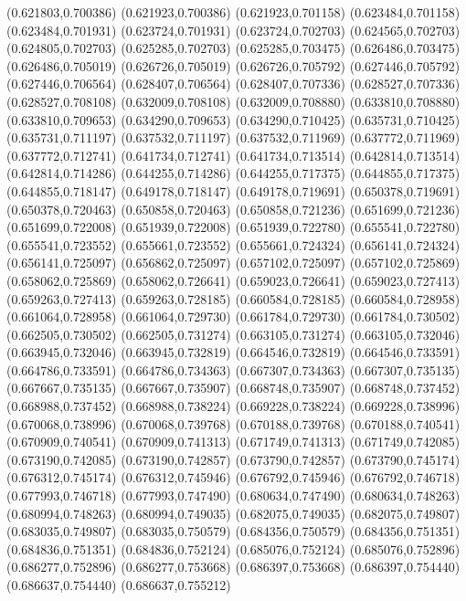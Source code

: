 (0.621803,0.700386)
(0.621923,0.700386)
(0.621923,0.701158)
(0.623484,0.701158)
(0.623484,0.701931)
(0.623724,0.701931)
(0.623724,0.702703)
(0.624565,0.702703)
(0.624805,0.702703)
(0.625285,0.702703)
(0.625285,0.703475)
(0.626486,0.703475)
(0.626486,0.705019)
(0.626726,0.705019)
(0.626726,0.705792)
(0.627446,0.705792)
(0.627446,0.706564)
(0.628407,0.706564)
(0.628407,0.707336)
(0.628527,0.707336)
(0.628527,0.708108)
(0.632009,0.708108)
(0.632009,0.708880)
(0.633810,0.708880)
(0.633810,0.709653)
(0.634290,0.709653)
(0.634290,0.710425)
(0.635731,0.710425)
(0.635731,0.711197)
(0.637532,0.711197)
(0.637532,0.711969)
(0.637772,0.711969)
(0.637772,0.712741)
(0.641734,0.712741)
(0.641734,0.713514)
(0.642814,0.713514)
(0.642814,0.714286)
(0.644255,0.714286)
(0.644255,0.717375)
(0.644855,0.717375)
(0.644855,0.718147)
(0.649178,0.718147)
(0.649178,0.719691)
(0.650378,0.719691)
(0.650378,0.720463)
(0.650858,0.720463)
(0.650858,0.721236)
(0.651699,0.721236)
(0.651699,0.722008)
(0.651939,0.722008)
(0.651939,0.722780)
(0.655541,0.722780)
(0.655541,0.723552)
(0.655661,0.723552)
(0.655661,0.724324)
(0.656141,0.724324)
(0.656141,0.725097)
(0.656862,0.725097)
(0.657102,0.725097)
(0.657102,0.725869)
(0.658062,0.725869)
(0.658062,0.726641)
(0.659023,0.726641)
(0.659023,0.727413)
(0.659263,0.727413)
(0.659263,0.728185)
(0.660584,0.728185)
(0.660584,0.728958)
(0.661064,0.728958)
(0.661064,0.729730)
(0.661784,0.729730)
(0.661784,0.730502)
(0.662505,0.730502)
(0.662505,0.731274)
(0.663105,0.731274)
(0.663105,0.732046)
(0.663945,0.732046)
(0.663945,0.732819)
(0.664546,0.732819)
(0.664546,0.733591)
(0.664786,0.733591)
(0.664786,0.734363)
(0.667307,0.734363)
(0.667307,0.735135)
(0.667667,0.735135)
(0.667667,0.735907)
(0.668748,0.735907)
(0.668748,0.737452)
(0.668988,0.737452)
(0.668988,0.738224)
(0.669228,0.738224)
(0.669228,0.738996)
(0.670068,0.738996)
(0.670068,0.739768)
(0.670188,0.739768)
(0.670188,0.740541)
(0.670909,0.740541)
(0.670909,0.741313)
(0.671749,0.741313)
(0.671749,0.742085)
(0.673190,0.742085)
(0.673190,0.742857)
(0.673790,0.742857)
(0.673790,0.745174)
(0.676312,0.745174)
(0.676312,0.745946)
(0.676792,0.745946)
(0.676792,0.746718)
(0.677993,0.746718)
(0.677993,0.747490)
(0.680634,0.747490)
(0.680634,0.748263)
(0.680994,0.748263)
(0.680994,0.749035)
(0.682075,0.749035)
(0.682075,0.749807)
(0.683035,0.749807)
(0.683035,0.750579)
(0.684356,0.750579)
(0.684356,0.751351)
(0.684836,0.751351)
(0.684836,0.752124)
(0.685076,0.752124)
(0.685076,0.752896)
(0.686277,0.752896)
(0.686277,0.753668)
(0.686397,0.753668)
(0.686397,0.754440)
(0.686637,0.754440)
(0.686637,0.755212)
